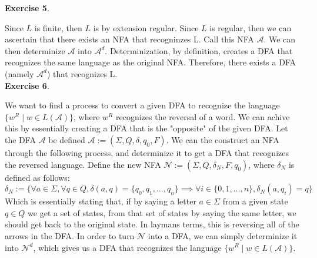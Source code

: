 \documentclass{article}
\begin{document}
\textbf{Exercise 5}.

Since $L$ is finite, then $L$ is by extension regular. Since $L$ is regular, then we can ascertain that there exists an NFA that recogninzes L. Call this NFA $\mathcal{A}$. We can then determinize $\mathcal{A}$ into $\mathcal{A}^d$. Determinization, by definition, creates a DFA that recognizes the same language as the original NFA. Therefore, there exists a DFA (namely $\mathcal{A}^d$) that recognizes L. \\

\textbf{Exercise 6}.

We want to find a process to convert a given DFA to recognize the language $\{w^R \mid w \in L(\mathcal{A})\}$, where $w^R$ recognizes the reversal of a word. We can achive this by essentially creating a DFA that is the "opposite" of the given DFA. Let the DFA $\mathcal{A}$ be defined $\mathcal{A} := (\Sigma, Q, \delta, q_0, F)$. We can the construct an NFA through the following process, and determinize it to get a DFA that recognizes the reversed language. Define the new NFA $\mathcal{N} := (\Sigma, Q, \delta_N, F, q_0)$, where $\delta_N$ is defined as follows: \[\delta_N := \{\forall a \in \Sigma, \forall q \in Q, \delta(a, q) = \{q_0, q_1, \ldots, q_n\} \implies \forall i \in \{0, 1, \ldots, n\}, \delta_N(a, q_i) = q\}\]
Which is essentially stating that, if by saying a letter $a \in \Sigma$ from a given state $q \in Q$ we get a set of states, from that set of states by saying the same letter, we should get back to the original state. In laymans terms, this is reversing all of the arrows in the DFA. 
In order to turn $\mathcal{N}$ into a DFA, we can simply determinize it into $\mathcal{N}^d$, which gives us a DFA that recognizes the language $\{w^R \mid w \in L(\mathcal{A})\}$.
\end{document}
